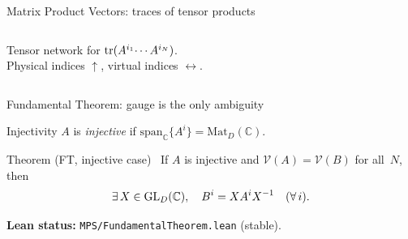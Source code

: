 \documentclass[aspectratio=169,10pt]{beamer}
\newcommand{\Mat}{\mathrm{Mat}}
\newcommand{\Span}{\mathrm{span}}
\begin{document}
\begin{frame}{Matrix Product Vectors: traces of tensor products}
\begin{columns}[T]
\begin{center}

            {\scriptsize\textcolor{dimwhite}{Tensor network for $\mathrm{tr}(A^{i_1}\!\cdots A^{i_N})$.\\
                    Physical indices $\uparrow$, virtual indices $\leftrightarrow$.}}
        \end{center}
    \end{columns}
\end{frame}

\begin{frame}{Fundamental Theorem: gauge is the only ambiguity}
    \vspace{-0.6em}

    \begin{block}{Injectivity}
        $A$ is \emph{injective} if $\Span_{\mathbb{C}}\{A^i\}=\Mat_D(\mathbb{C})$.
    \end{block}

    \begin{block}{Theorem (FT, injective case)~\cite{Perez-Garcia2007Matrix,Cirac2021Matrix}}
        If $A$ is injective and $\mathcal{V}(A)=\mathcal{V}(B)$ for all~$N$, then
        \[
            \exists\,X\in \mathrm{GL}_D(\mathbb{C}),\quad B^i = X A^i X^{-1}\quad (\forall\, i).
        \]
    \end{block}

    \textcolor{dimwhite}{\footnotesize\textbf{Lean status:} 
        \texttt{MPS/FundamentalTheorem.lean} (stable).}
\end{frame}
\end{document}
